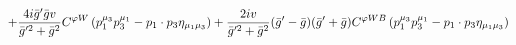 %
\begin{dmath*}
%
  +  \frac{4 i {\bar g}^\prime {\bar g}{} v}{{\bar g}^{\prime 2} + {\bar g}{}^2}C^{ \varphi  W} \left(p_1^{\mu_3} p_3^{\mu_1} - p_{1}\nobreak\cdot\nobreak{}p_{3} \eta_{\mu_1 \mu_3}\right)  +  \frac{2 i v}{{\bar g}^{\prime 2} + {\bar g}{}^2}({\bar g}^\prime - {\bar g}{}) ({\bar g}^\prime + {\bar g}{}) C^{ \varphi  WB} \left(p_1^{\mu_3} p_3^{\mu_1} - p_{1}\nobreak\cdot\nobreak{}p_{3} \eta_{\mu_1 \mu_3}\right)
%
\end{dmath*}
%
